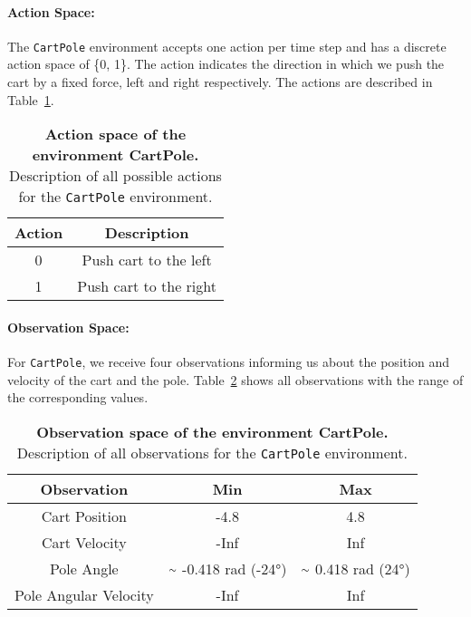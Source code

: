 \paragraph*{Action Space:} The \verb|CartPole| environment accepts one action per time step and has a discrete action space of \{0, 1\}. The action indicates the direction in which we push the cart by a fixed force, left and right respectively. The actions are described in Table~\ref{table:cartpole_act}.
\begin{table}[!ht]
  \centering
  \begin{tabular}{ |c|c| }
    \hline
    Action & Description \\
    \hline
    0 & Push cart to the left \\
    1 & Push cart to the right \\
    \hline
  \end{tabular}
  \caption[Action space of the environment CartPole]{
    \textbf{Action space of the environment CartPole.}
    Description of all possible actions for the \texttt{CartPole} environment.
  }
  \label{table:cartpole_act}
\end{table}

\paragraph*{Observation Space:} For \verb|CartPole|, we receive four observations informing us about the position and velocity of the cart and the pole. Table~\ref{table:cartpole_obs} shows all observations with the range of the corresponding values.
\begin{table}[!ht]
  \centering
  \begin{tabular}{ |c|c|c| }
    \hline
    Observation & Min & Max \\
    \hline
    Cart Position & -4.8 & 4.8 \\
    Cart Velocity & -Inf & Inf \\
    Pole Angle & $\smallsim$ -0.418 rad (-24°) & $\smallsim$ 0.418 rad (24°) \\
    Pole Angular Velocity & -Inf & Inf \\
    \hline
  \end{tabular}
  \caption[Observation space of the environment CartPole]{
    \textbf{Observation space of the environment CartPole.}
    Description of all observations for the \texttt{CartPole} environment.
  }
  \label{table:cartpole_obs}
\end{table}

